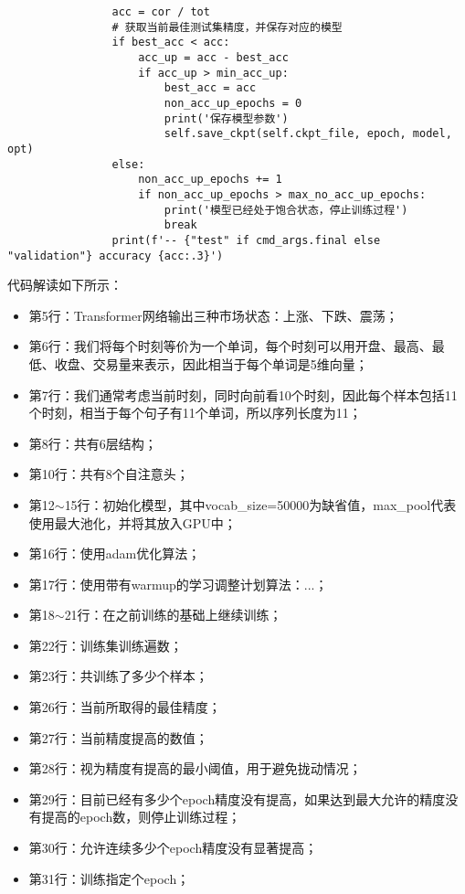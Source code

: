 \begin{lstlisting}
                acc = cor / tot
                # 获取当前最佳测试集精度，并保存对应的模型
                if best_acc < acc:
                    acc_up = acc - best_acc
                    if acc_up > min_acc_up:
                        best_acc = acc
                        non_acc_up_epochs = 0
                        print('保存模型参数')
                        self.save_ckpt(self.ckpt_file, epoch, model, opt)
                else:
                    non_acc_up_epochs += 1
                    if non_acc_up_epochs > max_no_acc_up_epochs:
                        print('模型已经处于饱合状态，停止训练过程')
                        break
                print(f'-- {"test" if cmd_args.final else "validation"} accuracy {acc:.3}')
\end{lstlisting}
代码解读如下所示：
\begin{itemize}
    \item 第5行：Transformer网络输出三种市场状态：上涨、下跌、震荡；
    \item 第6行：我们将每个时刻等价为一个单词，每个时刻可以用开盘、最高、最低、收盘、交易量来表示，因此相当于每个单词是5维向量；
    \item 第7行：我们通常考虑当前时刻，同时向前看10个时刻，因此每个样本包括11个时刻，相当于每个句子有11个单词，所以序列长度为11；
    \item 第8行：共有6层结构；
    \item 第10行：共有8个自注意头；
    \item 第12$\sim$15行：初始化模型，其中vocab\_size=50000为缺省值，max\_pool代表使用最大池化，并将其放入GPU中；
    \item 第16行：使用adam优化算法；
    \item 第17行：使用带有warmup的学习调整计划算法：...；
    \item 第18$\sim$21行：在之前训练的基础上继续训练；
    \item 第22行：训练集训练遍数；
    \item 第23行：共训练了多少个样本；
    \item 第26行：当前所取得的最佳精度；
    \item 第27行：当前精度提高的数值；
    \item 第28行：视为精度有提高的最小阈值，用于避免拢动情况；
    \item 第29行：目前已经有多少个epoch精度没有提高，如果达到最大允许的精度没有提高的epoch数，则停止训练过程；
    \item 第30行：允许连续多少个epoch精度没有显著提高；
    \item 第31行：训练指定个epoch；

\end{itemize}
